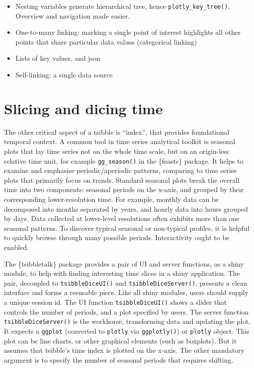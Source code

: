 \begin{itemize}
\tightlist
\item
  Nesting variables generate hierarchical tree, hence
  \texttt{plotly\_key\_tree()}. Overview and navigation made easier.
\item
  One-to-many linking: marking a single point of interest highlights all
  other points that share particular data values (categorical linking)
\item
  Lists of key values, and json
\item
  Self-linking: a single data source
\end{itemize}

\hypertarget{slicing-and-dicing-time}{%
\section{Slicing and dicing time}\label{slicing-and-dicing-time}}

The other critical aspect of a tsibble is ``index'', that provides
foundational temporal context. A common tool in time series analytical
toolkit is seasonal plots that lay time series not on the whole time
scale, but on an origin-less relative time unit, for example
\texttt{gg\_season()} in the \{feasts\} package. It helps to examine and
emphasise periodic/aperiodic patterns, comparing to time series plots
that primarily focus on trends. Standard seasonal plots break the
overall time into two components: seasonal periods on the x-axis, and
grouped by their corresponding lower-resolution time. For example,
monthly data can be decomposed into months separated by years, and
hourly data into hours grouped by days. Data collected at lower-level
resolutions often exhibits more than one seasonal patterns. To discover
typical seasonal or non-typical profiles, it is helpful to quickly
browse through many possible periods. Interactivity ought to be enabled.

The \{tsibbletalk\} package provides a pair of UI and server functions,
as a shiny module, to help with finding interesting time slices in a
shiny application. The pair, decoupled to \texttt{tsibbleDiceUI()} and
\texttt{tsibbleDiceServer()}, presents a clean interface and forms a
resusable piece. Like all shiny modules, users should supply a unique
session id. The UI function \texttt{tsibbleDiceUI()} shows a slider that
controls the number of periods, and a plot specified by users. The
server function \texttt{tsibbleDiceServer()} is the workhorse,
transforming data and updating the plot. It expects a \texttt{ggplot}
(converted to \texttt{plotly} via \texttt{ggplotly()}) or
\texttt{plotly} object. This plot can be line charts, or other graphical
elements (such as boxplots). But it assumes that tsibble's time index is
plotted on the x-axis. The other mandatory argument is to specify the
number of seasonal periods that requires shifting.

